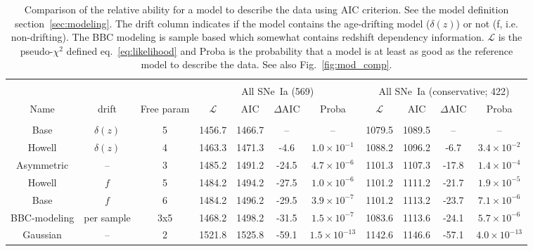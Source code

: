\documentclass[]{aa} %
\begin{document}
\begin{table}
    \centering
    \caption{Comparison of the relative ability for a model to describe the data
        using AIC criterion. See the model definition
        section~\ref{sec:modeling}. The drift column indicates if the model
        contains the age-drifting model ($\delta(z)$) or not (f, i.e.
        non-drifting). The BBC modeling is sample based which somewhat contains
        redshift dependency information. $\mathcal{L}$ is the pseudo-$\chi^{2}$
        defined eq.~\ref{eq:likelihood} and Proba is the probability that a
        model is at least as good as the reference model to describe the data.
    See also Fig.~\ref{fig:mod_comp}.}
    \label{tab:comp}
    \begin{tabular}{c c c  |c c c c|  c c c c}\hline\hline\\[-0.8em]
        & & & \multicolumn{4}{|c}{All SNe~Ia (569)} & \multicolumn{4}{|c}{All SNe~Ia (conservative; 422)} \\
        Name & drift & Free param &
        $\mathcal{L}$ & $\mathrm{AIC}$ & $\Delta \mathrm{AIC}$ & Proba & $\mathcal{L}$ & $\mathrm{AIC}$ & $\Delta \mathrm{AIC}$ & Proba \\[0.15em]
        \hline\\[-0.8em]

        Base & $\delta(z)$ & 5
        & 1456.7 & 1466.7 & -- & --
        & 1079.5 & 1089.5 & -- & --\\[0.15em]

        Howell & $\delta(z)$ & 4
        & 1463.3 & 1471.3 & -4.6 & $1.0\times10^{-1}$
        & 1088.2 & 1096.2 & -6.7 & $3.4\times10^{-2}$\\[0.15em]

        Asymmetric & -- & 3
        & 1485.2 & 1491.2 & -24.5 & $4.7\times10^{-6}$
        & 1101.3 & 1107.3 & -17.8 & $1.4\times10^{-4}$\\[0.15em]

        Howell & $f$ & 5
        & 1484.2 & 1494.2 & -27.5 & $1.0\times10^{-6}$
        & 1101.2 & 1111.2 & -21.7 & $1.9\times10^{-5}$\\[0.15em]

        Base & $f$ & 6
        & 1484.2 & 1496.2 & -29.5 & $3.9\times10^{-7}$
        & 1101.2 & 1113.2 & -23.7 & $7.1\times10^{-6}$\\[0.15em]

        BBC-modeling & per sample & 3x5
        & 1468.2 & 1498.2 & -31.5 & $1.5\times10^{-7}$
        & 1083.6 & 1113.6 & -24.1 & $5.7\times10^{-6}$\\[0.15em]

        Gaussian & -- & 2
        & 1521.8 & 1525.8 & -59.1 & $1.5\times10^{-13}$
        & 1142.6 & 1146.6 & -57.1 & $4.0\times10^{-13}$ \\\hline\hline
    \end{tabular}
\end{table}
\end{document}
